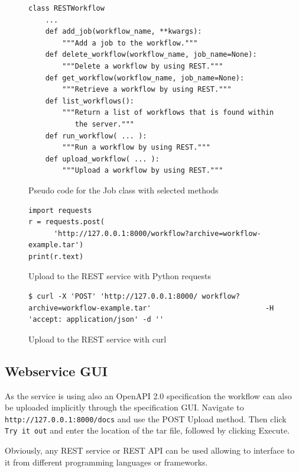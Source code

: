 \begin{figure}[t]
\begin{verbatim}
class RESTWorkflow
    ...
    def add_job(workflow_name, **kwargs):
        """Add a job to the workflow."""
    def delete_workflow(workflow_name, job_name=None):
        """Delete a workflow by using REST."""
    def get_workflow(workflow_name, job_name=None):
        """Retrieve a workflow by using REST."""
    def list_workflows():
        """Return a list of workflows that is found within
           the server."""
    def run_workflow( ... ):
        """Run a workflow by using REST."""
    def upload_workflow( ... ):
        """Upload a workflow by using REST."""
\end{verbatim}
\caption{Pseudo code for the Job class with selected methods}
\label{fig:code-workflow-rest-commandline}

\bigskip

\begin{verbatim}
import requests
r = requests.post(
      'http://127.0.0.1:8000/workflow?archive=workflow-example.tar')
print(r.text)
\end{verbatim}
\caption{Upload to the REST service with Python requests}
\label{fig:code-workflow-requests}

\bigskip

\begin{verbatim}
$ curl -X 'POST' 'http://127.0.0.1:8000/ workflow?archive=workflow-example.tar'                           -H 'accept: application/json' -d ''
\end{verbatim}%
\caption{Upload to the REST service with curl}
\label{fig:code-workflow-curl}

\end{figure}


\subsection{Webservice GUI}

As the service is using also an OpenAPI 2.0 specification the workflow
can also be uploaded implicitly through the specification
GUI. Navigate to \texttt{http://127.0.0.1:8000/docs} and use the POST
Upload method. Then click \texttt{Try\ it\ out} and enter the
location of the tar file, followed by clicking Execute.

Obviously, any REST service or REST API can be used allowing to
interface to it from different programming languages or frameworks.


